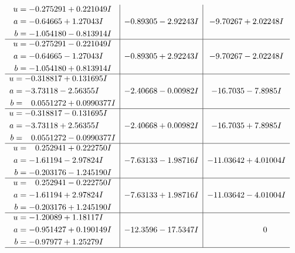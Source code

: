 \documentclass[1p]{elsarticle_modified}
\theoremstyle{definition}
\begin{document}
$$\begin{array}{c|c|c}
\begin{aligned}
u &= -0.275291 + 0.221049 I \\
a &= -0.64665 + 1.27043 I \\
b &= -1.054180 - 0.813914 I\end{aligned}
 & -0.89305 - 2.92243 I & -9.70267 + 2.02248 I \\ \hline\begin{aligned}
u &= -0.275291 - 0.221049 I \\
a &= -0.64665 - 1.27043 I \\
b &= -1.054180 + 0.813914 I\end{aligned}
 & -0.89305 + 2.92243 I & -9.70267 - 2.02248 I \\ \hline\begin{aligned}
u &= -0.318817 + 0.131695 I \\
a &= -3.73118 - 2.56355 I \\
b &= \phantom{-}0.0551272 + 0.0990377 I\end{aligned}
 & -2.40668 - 0.00982 I & -16.7035 - 7.8985 I \\ \hline\begin{aligned}
u &= -0.318817 - 0.131695 I \\
a &= -3.73118 + 2.56355 I \\
b &= \phantom{-}0.0551272 - 0.0990377 I\end{aligned}
 & -2.40668 + 0.00982 I & -16.7035 + 7.8985 I \\ \hline\begin{aligned}
u &= \phantom{-}0.252941 + 0.222750 I \\
a &= -1.61194 - 2.97824 I \\
b &= -0.203176 - 1.245190 I\end{aligned}
 & -7.63133 - 1.98716 I & -11.03642 + 4.01004 I \\ \hline\begin{aligned}
u &= \phantom{-}0.252941 - 0.222750 I \\
a &= -1.61194 + 2.97824 I \\
b &= -0.203176 + 1.245190 I\end{aligned}
 & -7.63133 + 1.98716 I & -11.03642 - 4.01004 I \\ \hline\begin{aligned}
u &= -1.20089 + 1.18117 I \\
a &= -0.951427 + 0.190149 I \\
b &= -0.97977 + 1.25279 I\end{aligned}
 & -12.3596 - 17.5347 I & \phantom{-0.000000 } 0\\
 \hline 

\end{array}$$
\end{document}
